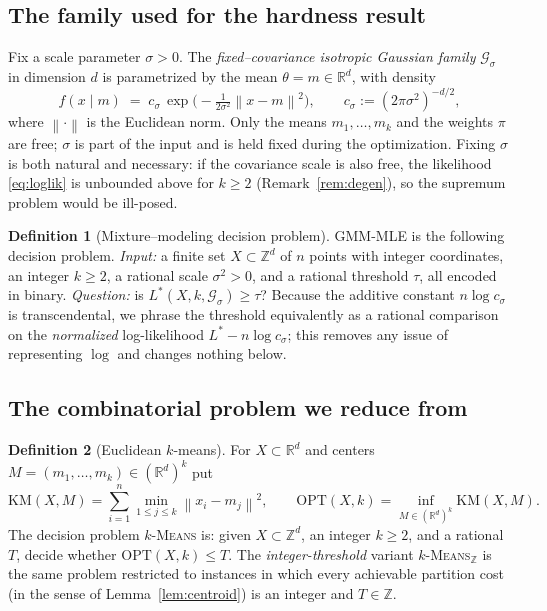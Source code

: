 \documentclass{amsart}
\theoremstyle{plain}
\theoremstyle{definition}
\newtheorem{definition}{Definition}
\newcommand{\R}{\mathbb{R}}
\newcommand{\Z}{\mathbb{Z}}
\newcommand{\norm}[1]{\left\lVert #1 \right\rVert}
\begin{document}
\subsection{The family used for the hardness result}
Fix a scale parameter $\sigma>0$. The \emph{fixed--covariance isotropic Gaussian
family} $\mathcal G_{\sigma}$ in dimension $d$ is parametrized by the mean
$\theta=m\in\R^{d}$, with density
\begin{equation}\label{eq:gauss}
f(x\mid m)\;=\;c_{\sigma}\,\exp\!\Big(-\tfrac{1}{2\sigma^{2}}\norm{x-m}^{2}\Big),
\qquad c_{\sigma}:=(2\pi\sigma^{2})^{-d/2},
\end{equation}
where $\norm{\cdot}$ is the Euclidean norm. Only the means $m_{1},\dots,m_{k}$ and
the weights $\pi$ are free; $\sigma$ is part of the input and is held fixed during
the optimization. Fixing $\sigma$ is both natural and necessary: if the covariance
scale is also free, the likelihood \eqref{eq:loglik} is unbounded above for
$k\ge2$ (Remark~\ref{rem:degen}), so the supremum problem would be ill-posed.

\begin{definition}[Mixture--modeling decision problem]\label{def:mmdec}
\textsc{GMM-MLE} is the following decision problem. \emph{Input:} a finite set
$X\subset\Z^{d}$ of $n$ points with integer coordinates, an integer $k\ge2$, a
rational scale $\sigma^{2}>0$, and a rational threshold $\tau$, all encoded in
binary. \emph{Question:} is $L^{\ast}(X,k,\mathcal G_{\sigma})\ge\tau$?
Because the additive constant $n\log c_{\sigma}$ is transcendental, we phrase the
threshold equivalently as a rational comparison on the \emph{normalized}
log-likelihood $L^{\ast}-n\log c_{\sigma}$; this removes any issue of representing
$\log$ and changes nothing below.
\end{definition}

\subsection{The combinatorial problem we reduce from}
\begin{definition}[Euclidean $k$-means]\label{def:kmeans}
For $X\subset\R^{d}$ and centers $M=(m_{1},\dots,m_{k})\in(\R^{d})^{k}$ put
\[
\mathrm{KM}(X,M)=\sum_{i=1}^{n}\min_{1\le j\le k}\norm{x_{i}-m_{j}}^{2},
\qquad
\mathrm{OPT}(X,k)=\inf_{M\in(\R^{d})^{k}}\mathrm{KM}(X,M).
\]
The decision problem \textsc{$k$-Means} is: given $X\subset\Z^{d}$, an integer
$k\ge2$, and a rational $T$, decide whether $\mathrm{OPT}(X,k)\le T$. The
\emph{integer-threshold} variant \textsc{$k$-Means$_{\Z}$} is the same problem
restricted to instances in which every achievable partition cost (in the sense of
Lemma~\ref{lem:centroid}) is an integer and $T\in\Z$.
\end{definition}
\end{document}
